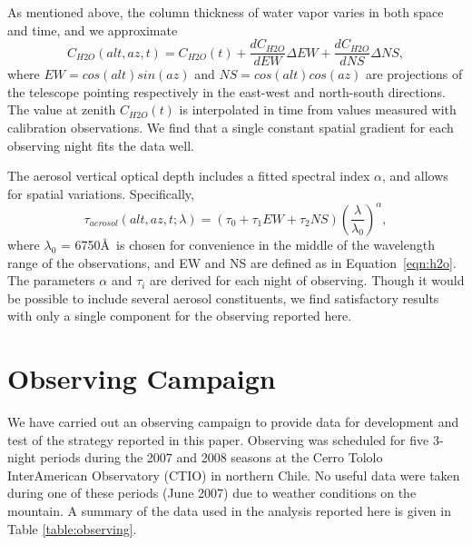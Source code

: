 \documentclass[manuscript]{aastex}
\begin{document}
As mentioned above, the column thickness of water vapor varies in both space and time, and we approximate
\begin{equation}
\label{eqn:h2o}
   C_{H2O}(alt,az,t) = C_{H2O}(t) + \frac{dC_{H2O}}{d EW} \Delta EW + \frac{dC_{H2O}}{d NS} \Delta NS,
\end{equation}
where $EW = cos(alt)sin(az)$ and $NS = cos(alt)cos(az)$ are projections of the telescope pointing respectively in the east-west
and north-south directions.
The value at zenith $C_{H2O}(t)$ is interpolated in time from values measured with calibration observations.
We find that a single constant spatial gradient for each observing night fits the data well. 

The aerosol vertical optical depth includes a fitted spectral index $\alpha$, and allows for spatial variations.
Specifically,
\begin{equation}
\label{eqn:aertau}
   \tau_{aerosol}(alt,az,t; \lambda) = (\tau_{0} + \tau_{1} EW + \tau_{2} NS) \left(\frac{\lambda}{\lambda_0}\right)^\alpha,
\end{equation}
where $\lambda_0$ = 6750\AA~is chosen for convenience in the middle of the wavelength range of the observations,
and EW and NS are defined as in Equation~\ref{eqn:h2o}.
The parameters $\alpha$ and $\tau_{i}$ are derived for each night of observing.
Though it would be possible to include several aerosol constituents,
we find satisfactory results with only a single component for the observing reported here.


\section{Observing Campaign}

We have carried out an observing campaign to provide data for development and test of the strategy reported in this paper.
Observing was scheduled for five 3-night periods during the 2007 and 2008 seasons at the Cerro Tololo InterAmerican Observatory (CTIO)
in northern Chile. 
No useful data were taken during one of these periods (June 2007) due to weather conditions on the mountain. 
A summary of the data used in the analysis reported here is given in Table \ref{table:observing}.
\end{document}
